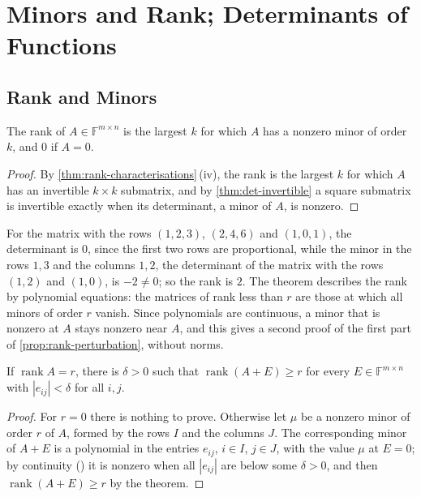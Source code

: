 \section{Minors and Rank; Determinants of Functions}
\label{sec:minors-functions}

\subsection{Rank and Minors}

\begin{theorem}
\label{thm:rank-minors}
The rank of $A\in\mathbb F^{m\times n}$ is the largest $k$ for which $A$ has a nonzero minor of order $k$, and $0$ if $A=0$.
\end{theorem}

\begin{proof}
By \cref{thm:rank-characterisations}\,(iv), the rank is the largest $k$ for which $A$ has an invertible $k\times k$ submatrix, and by \cref{thm:det-invertible} a square submatrix is invertible exactly when its determinant, a minor of $A$, is nonzero.
\end{proof}

For the matrix with the rows $(1,2,3)$, $(2,4,6)$ and $(1,0,1)$, the determinant is $0$, since the first two rows are proportional, while the minor in the rows $1,3$ and the columns $1,2$, the determinant of the matrix with the rows $(1,2)$ and $(1,0)$, is $-2\ne0$; so the rank is $2$. The theorem describes the rank by polynomial equations: the matrices of rank less than $r$ are those at which all minors of order $r$ vanish. Since polynomials are continuous, a minor that is nonzero at $A$ stays nonzero near $A$, and this gives a second proof of the first part of \cref{prop:rank-perturbation}, without norms.

\begin{corollary}
\label{cor:rank-lsc}
If $\operatorname{rank}A=r$, there is $\delta>0$ such that $\operatorname{rank}(A+E)\ge r$ for every $E\in\mathbb F^{m\times n}$ with $|e_{ij}|<\delta$ for all $i,j$.
\end{corollary}

\begin{proof}
For $r=0$ there is nothing to prove. Otherwise let $\mu$ be a nonzero minor of order $r$ of $A$, formed by the rows $I$ and the columns $J$. The corresponding minor of $A+E$ is a polynomial in the entries $e_{ij}$, $i\in I$, $j\in J$, with the value $\mu$ at $E=0$; by continuity () it is nonzero when all $|e_{ij}|$ are below some $\delta>0$, and then $\operatorname{rank}(A+E)\ge r$ by the theorem.
\end{proof}

